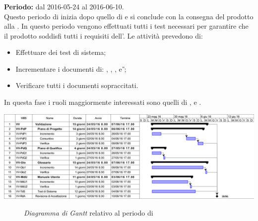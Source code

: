 \subsubsection{\VV}
\textbf{Periodo:} dal 2016-05-24 al 2016-06-10. \\
Questo periodo di \VV{} inizia dopo quello di \CO{} e si conclude con la consegna del prodotto alla \RA. In questo periodo vengono effettuati tutti i test necessari per garantire che il prodotto soddisfi tutti i requisiti dell'\AR.
Le attività prevedono di:
\begin{itemize}
	\item Effettuare dei test di sistema;
	\item Incrementare i documenti di: \textit{\MU}, \textit{\NdP}, \textit{\PdP}, \textit{\PdQ} e \textit{\G};
	\item Verificare tutti i documenti sopraccitati.
\end{itemize}
In questa fase i ruoli maggiormente interessati sono quelli di \textit{\Res}, \textit{\Prog} e \textit{\Ver}.
\newpage
\begin{center}
	\includegraphics[keepaspectratio = true, width=16cm]{immagini/PdP_ValidazioneGantt.png}
\end{center}
\begin{figure}[h]
	\caption{\textit{Diagramma di Gantt} relativo al periodo di \VV}\label{etichetta}
\end{figure}
